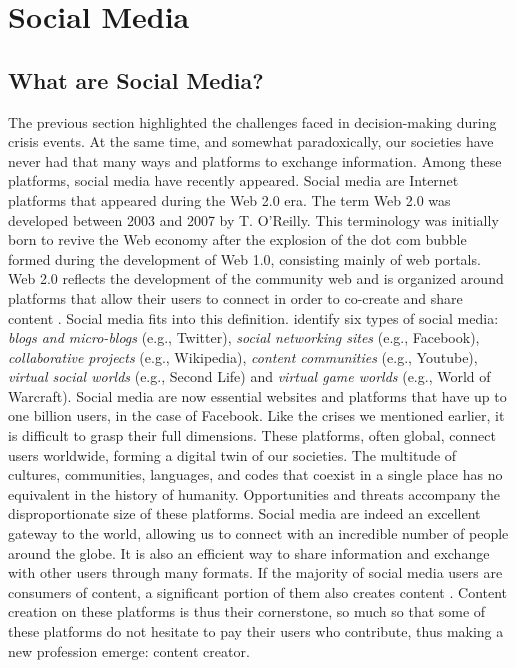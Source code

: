 \section{Social Media}
\subsection{What are Social Media?}
The previous section highlighted the challenges faced in decision-making during crisis events.
At the same time, and somewhat paradoxically, our societies have never had that many ways and platforms to exchange information.
Among these platforms, social media have recently appeared.
Social media are Internet platforms that appeared during the Web 2.0 era.
The term Web 2.0 was developed between 2003 and 2007 by T. O'Reilly.
This terminology was initially born to revive the Web economy after the explosion of the dot com bubble formed during the development of Web 1.0, consisting mainly of web portals.
Web 2.0 reflects the development of the community web and is organized around platforms that allow their users to connect in order to co-create and share content \textcite{oreillyWhatWebDesign2007b}.
Social media fits into this definition.
\textcite{kaplanUsersWorldUnite2010} identify six types of social media: \emph{blogs and micro-blogs} (e.g., Twitter), \emph{social networking sites} (e.g., Facebook), \emph{collaborative projects} (e.g., Wikipedia), \emph{content communities} (e.g., Youtube), \emph{virtual social worlds} (e.g., Second Life) and \emph{virtual game worlds} (e.g., World of Warcraft).
Social media are now essential websites and platforms that have up to one billion users, in the case of Facebook.
Like the crises we mentioned earlier, it is difficult to grasp their full dimensions.
These platforms, often global, connect users worldwide, forming a digital twin of our societies.
The multitude of cultures, communities, languages, and codes that coexist in a single place has no equivalent in the history of humanity.
Opportunities and threats accompany the disproportionate size of these platforms.
Social media are indeed an excellent gateway to the world, allowing us to connect with an incredible number of people around the globe.
It is also an efficient way to share information and exchange with other users through many formats.
If the majority of social media users are consumers of content, a significant portion of them also creates content \parencite{fuchsSocialMediaCritical2021}.
Content creation on these platforms is thus their cornerstone, so much so that some of these platforms do not hesitate to pay their users who contribute, thus making a new profession emerge: content creator.

